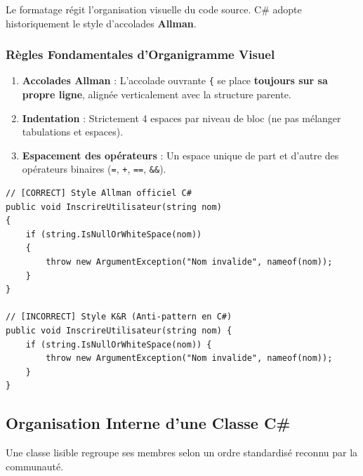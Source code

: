Le formatage régit l'organisation visuelle du code source. C\# adopte historiquement le style d'accolades \textbf{Allman}.

\subsubsection{Règles Fondamentales d'Organigramme Visuel}

\begin{enumerate}
    \item \textbf{Accolades Allman} : L'accolade ouvrante \texttt{\{} se place \textbf{toujours sur sa propre ligne}, alignée verticalement avec la structure parente.
    \item \textbf{Indentation} : Strictement 4 espaces par niveau de bloc (ne pas mélanger tabulations et espaces).
    \item \textbf{Espacement des opérateurs} : Un espace unique de part et d'autre des opérateurs binaires (\texttt{=}, \texttt{+}, \texttt{==}, \texttt{\&\&}).
\end{enumerate}

\begin{lstlisting}[caption={Comparaison de formatage : Allman (C\#) vs K\&R (Java/JS)}]
// [CORRECT] Style Allman officiel C#
public void InscrireUtilisateur(string nom)
{
    if (string.IsNullOrWhiteSpace(nom))
    {
        throw new ArgumentException("Nom invalide", nameof(nom));
    }
}

// [INCORRECT] Style K&R (Anti-pattern en C#)
public void InscrireUtilisateur(string nom) {
    if (string.IsNullOrWhiteSpace(nom)) {
        throw new ArgumentException("Nom invalide", nameof(nom));
    }
}
\end{lstlisting}



\subsection{Organisation Interne d'une Classe C\#}

Une classe lisible regroupe ses membres selon un ordre standardisé reconnu par la communauté.

